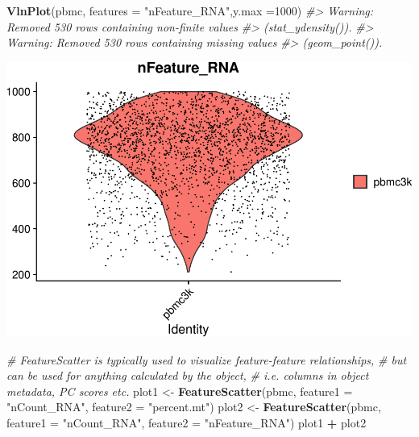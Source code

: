 \documentclass[
]{book}
\newenvironment{Shaded}{\begin{snugshade}}{\end{snugshade}}
\newcommand{\AttributeTok}[1]{\textcolor[rgb]{0.13,0.29,0.53}{#1}}
\newcommand{\CommentTok}[1]{\textcolor[rgb]{0.56,0.35,0.01}{\textit{#1}}}
\newcommand{\DecValTok}[1]{\textcolor[rgb]{0.00,0.00,0.81}{#1}}
\newcommand{\FunctionTok}[1]{\textcolor[rgb]{0.13,0.29,0.53}{\textbf{#1}}}
\newcommand{\NormalTok}[1]{#1}
\newcommand{\OtherTok}[1]{\textcolor[rgb]{0.56,0.35,0.01}{#1}}
\newcommand{\SpecialCharTok}[1]{\textcolor[rgb]{0.81,0.36,0.00}{\textbf{#1}}}
\newcommand{\StringTok}[1]{\textcolor[rgb]{0.31,0.60,0.02}{#1}}
\begin{document}
\begin{Shaded}
\begin{Highlighting}[]
\FunctionTok{VlnPlot}\NormalTok{(pbmc, }\AttributeTok{features =} \StringTok{"nFeature\_RNA"}\NormalTok{,}\AttributeTok{y.max =}\DecValTok{1000}\NormalTok{)}
\CommentTok{\#\textgreater{} Warning: Removed 530 rows containing non{-}finite values}
\CommentTok{\#\textgreater{} (\textasciigrave{}stat\_ydensity()\textasciigrave{}).}
\CommentTok{\#\textgreater{} Warning: Removed 530 rows containing missing values}
\CommentTok{\#\textgreater{} (\textasciigrave{}geom\_point()\textasciigrave{}).}
\end{Highlighting}
\end{Shaded}

\includegraphics{scRNAseqInR_Doco_files/figure-latex/qc2-3.pdf}

\begin{Shaded}
\begin{Highlighting}[]


\CommentTok{\# FeatureScatter is typically used to visualize feature{-}feature relationships, }
\CommentTok{\# but can be used for anything calculated by the object, }
\CommentTok{\# i.e. columns in object metadata, PC scores etc.}
\NormalTok{plot1 }\OtherTok{\textless{}{-}} \FunctionTok{FeatureScatter}\NormalTok{(pbmc, }\AttributeTok{feature1 =} \StringTok{"nCount\_RNA"}\NormalTok{, }\AttributeTok{feature2 =} \StringTok{"percent.mt"}\NormalTok{) }
\NormalTok{plot2 }\OtherTok{\textless{}{-}} \FunctionTok{FeatureScatter}\NormalTok{(pbmc, }\AttributeTok{feature1 =} \StringTok{"nCount\_RNA"}\NormalTok{, }\AttributeTok{feature2 =} \StringTok{"nFeature\_RNA"}\NormalTok{) }
\NormalTok{plot1 }\SpecialCharTok{+}\NormalTok{ plot2}
\end{Highlighting}
\end{Shaded}
\end{document}
